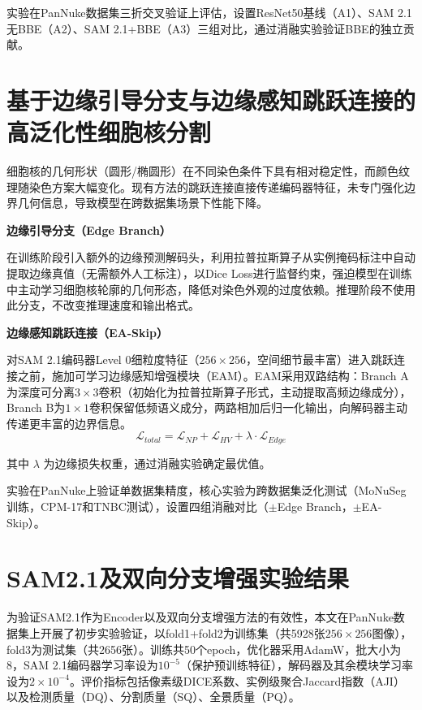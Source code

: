 \documentclass{sufethesismas}
\begin{document}
实验在PanNuke数据集三折交叉验证上评估，设置ResNet50基线（A1）、SAM 2.1无BBE（A2）、SAM 2.1+BBE（A3）三组对比，通过消融实验验证BBE的独立贡献。

\section[基于边缘引导分支与边缘感知跳跃连接的高泛化性细胞核分割]{基于边缘引导分支与边缘感知跳跃连接的\\高泛化性细胞核分割}

细胞核的几何形状（圆形/椭圆形）在不同染色条件下具有相对稳定性，而颜色纹理随染色方案大幅变化。现有方法的跳跃连接直接传递编码器特征，未专门强化边界几何信息，导致模型在跨数据集场景下性能下降。

\textbf{边缘引导分支（Edge Branch）}

在训练阶段引入额外的边缘预测解码头，利用拉普拉斯算子从实例掩码标注中自动提取边缘真值（无需额外人工标注），以Dice Loss进行监督约束，强迫模型在训练中主动学习细胞核轮廓的几何形态，降低对染色外观的过度依赖。推理阶段不使用此分支，不改变推理速度和输出格式。

\textbf{边缘感知跳跃连接（EA-Skip）}

对SAM 2.1编码器Level 0细粒度特征（$256\times256$，空间细节最丰富）进入跳跃连接之前，施加可学习边缘感知增强模块（EAM）。EAM采用双路结构：Branch A为深度可分离$3\times3$卷积（初始化为拉普拉斯算子形式，主动提取高频边缘成分），Branch B为$1\times1$卷积保留低频语义成分，两路相加后归一化输出，向解码器主动传递更丰富的边界信息。
\begin{equation}
  \mathcal{L}_{total} = \mathcal{L}_{NP} + \mathcal{L}_{HV} + \lambda \cdot \mathcal{L}_{Edge}
\end{equation}

其中 $\lambda$ 为边缘损失权重，通过消融实验确定最优值。

实验在PanNuke上验证单数据集精度，核心实验为跨数据集泛化测试（MoNuSeg训练，CPM-17和TNBC测试），设置四组消融对比（$\pm$Edge Branch，$\pm$EA-Skip）。


\section{SAM2.1及双向分支增强实验结果}

为验证SAM2.1作为Encoder以及双向分支增强方法的有效性，本文在PanNuke数据集上开展了初步实验验证，以fold1+fold2为训练集（共5928张$256\times256$图像），fold3为测试集（共2656张）。训练共50个epoch，优化器采用AdamW，批大小为8，SAM 2.1编码器学习率设为$10^{-5}$（保护预训练特征），解码器及其余模块学习率设为$2\times10^{-4}$。评价指标包括像素级DICE系数、实例级聚合Jaccard指数（AJI）以及检测质量（DQ）、分割质量（SQ）、全景质量（PQ）。
\end{document}
